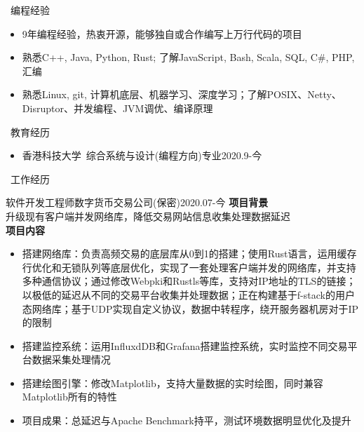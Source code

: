 \documentclass[UTF8]{resume}
\begin{document}
  

\begin{rSection}{\faCogs~编程经验}
    \begin{itemize}
        \item 9年编程经验，热衷开源，能够独自或合作编写上万行代码的项目
        \item 熟悉C++, Java, Python, Rust; 了解JavaScript, Bash, Scala, SQL, C\#, PHP, 汇编
        \item 熟悉Linux, git, 计算机底层、机器学习、深度学习；了解POSIX、Netty、Disruptor、并发编程、JVM调优、编译原理
    \end{itemize}
    
\end{rSection}
\begin{rSection}{\faGraduationCap~教育经历}
    \begin{itemize}
        \item 香港科技大学~综合系统与设计(编程方向)专业\hfill 2020.9-今
    \end{itemize}
\end{rSection}

\begin{rSection}{\faBriefcase~工作经历}
    \begin{rExperience}{软件开发工程师}{数字货币交易公司(保密)}{2020.07-今}
        \textbf{项目背景}\\
        升级现有客户端并发网络库，降低交易网站信息收集处理数据延迟\\
        \textbf{项目内容}
        \begin{itemize}
            \itemsep -0.5em \vspace{-0.5em}
            \item 搭建网络库：负责高频交易的底层库从0到1的搭建；使用Rust语言，运用缓存行优化和无锁队列等底层优化，实现了一套处理客户端并发的网络库，并支持多种通信协议；通过修改Webpki和Rustls等库，支持对IP地址的TLS的链接；以极低的延迟从不同的交易平台收集并处理数据；正在构建基于f-stack的用户态网络库；基于UDP实现自定义协议，数据中转程序，绕开服务器机房对于IP的限制
            \item 搭建监控系统：运用InfluxdDB和Grafana搭建监控系统，实时监控不同交易平台数据采集处理情况
            \item 搭建绘图引擎：修改Matplotlib，支持大量数据的实时绘图，同时兼容Matplotlib所有的特性
            \item 项目成果：总延迟与Apache Benchmark持平，测试环境数据明显优化及提升
        \end{itemize}
    \end{rExperience}
\end{rSection}
\end{document}
